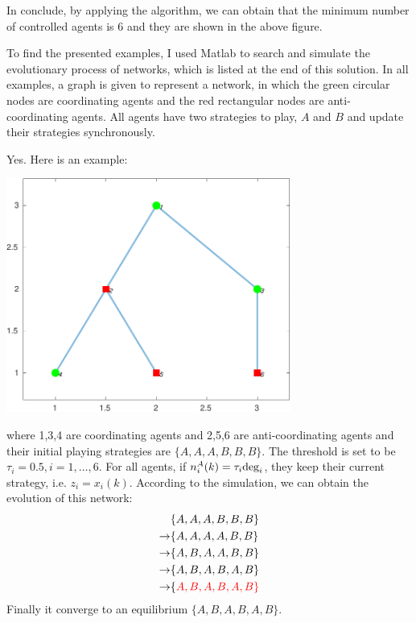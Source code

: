\documentclass[a4 paper, 12pt]{article}
\begin{document}
In conclude, by applying the algorithm, we can obtain that the minimum number of controlled agents is 6 and they are shown in the above figure.



 To find the presented examples, I used Matlab to search and simulate the evolutionary process of networks, which is listed at the end of this solution. In all examples, a graph is given to represent a network, in which the green circular nodes are coordinating agents and the red rectangular nodes are anti-coordinating agents. All agents have two strategies to play, $A$ and $B$ and update their strategies synchronously.

 Yes. Here is an example:
\begin{center}
        \includegraphics[width = 0.7\textwidth]{converge.pdf}
\end{center}
where 1,3,4 are coordinating agents and 2,5,6 are anti-coordinating agents and their initial playing strategies are $\{A,A,A,B,B,B\}$. The threshold is set to be $\tau_i = 0.5, i = 1,\dots,6$. For all agents, if $n_i^A(k)=\tau_i\textnormal{deg}_i$, they keep their current strategy, i.e. $z_i = x_i(k)$. According to the simulation, we can obtain the evolution of this network:
\begin{equation*}
        \begin{aligned}
                &\{A,A,A,B,B,B\} \\
                \rightarrow &\{A,A,A,A,B,B\} \\ 
                \rightarrow &\{A,B,A,A,B,B\} \\
                \rightarrow &\{A,B,A,B,A,B\} \\
                \rightarrow &\{\color{red}A,B,A,B,A,B\}
        \end{aligned}
\end{equation*}
Finally it converge to an equilibrium $\{A,B,A,B,A,B\}$.
\end{document}
